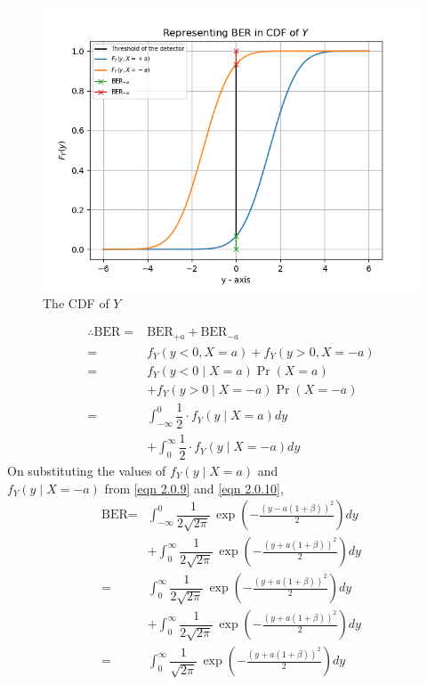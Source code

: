 \documentclass[journal,10pt,twocolumn]{IEEEtran}
\begin{document}
\begin{figure}
    \centering    
	\includegraphics[width=\columnwidth]{./Figures/Figure_1.png}
    \caption{The CDF of $Y$}
\end{figure}
\begin{align}
\therefore \text{BER} = {}& \text{BER}_{+a} + \text{BER}_{-a}\\
= {}& f_Y(y < 0, X = a) + f_Y(y>0, X = -a)\\
 = {}& f_Y(y<0\;|\;X = a) \Pr(X=a) \nonumber \\ &+ f_Y(y>0\;|\;X = -a) \Pr(X=-a)\\
 = {}& \int_{- \infty} ^ 0 \dfrac{1}{2} \cdot f_Y(y\;|\;X = a) dy \nonumber \\
 &+ \int_{0} ^{ \infty} \dfrac{1}{2} \cdot f_Y(y\;|\;X = -a) dy
\end{align}
On substituting the values of $f_Y(y\;|\;X=a)$ and\\
$f_Y(y\;|\;X=-a)$ from \ref{eqn 2.0.9} and \ref{eqn 2.0.10}, 
\begin{align}
\text{BER} = {}& \int_{- \infty } ^ 0 \dfrac{1}{2\sqrt{2\pi}}\,\exp \left(-\frac{(y - a(1 + \beta))^2}{2} \right) dy \nonumber \\
&+ \int_{0} ^ {\infty } \dfrac{1}{2\sqrt{2\pi}}\,\exp \left(-\frac{(y + a(1 + \beta))^2}{2} \right) dy\\
 = {}& \int_{0} ^ {\infty } \dfrac{1}{2\sqrt{2\pi}}\,\exp \left(-\frac{(y + a(1 + \beta))^2}{2} \right) dy \nonumber \\
 &+ \int_{0} ^ {\infty } \dfrac{1}{2\sqrt{2\pi}}\,\exp \left(-\frac{(y + a(1 + \beta))^2}{2} \right) dy\\
 = {}& \int_{0} ^ {\infty } \dfrac{1}{\sqrt{2\pi}}\,\exp \left(-\frac{(y + a(1 + \beta))^2}{2} \right) dy \label{eqn 2.0.19}
\end{align} 
\end{document}
